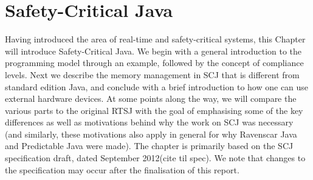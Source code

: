 \chapter{Safety-Critical Java}
\label{chapter:scj}
Having introduced the area of real-time and safety-critical systems, this Chapter will introduce Safety-Critical Java. We begin with a general introduction to the programming model through an example, followed by the concept of compliance levels. Next we describe the memory management in SCJ that is different from standard edition Java, and conclude with a brief introduction to how one can use external hardware devices.
At some points along the way, we will compare the various parts to the original RTSJ with the goal of emphasising some of the key differences as well as motivations behind why the work on SCJ was necessary (and similarly, these motivations also apply in general for why Ravenscar Java and Predictable Java were made). The chapter is primarily based on the SCJ specification draft, dated September 2012(cite til spec). We note that changes to the specification may occur after the finalisation of this report.